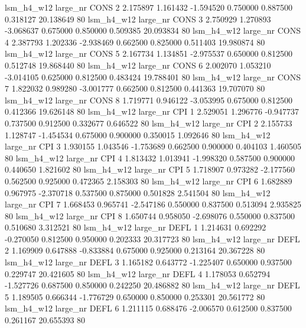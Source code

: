   lsm_h4_w12   large_nr     CONS                 2  2.175897  1.161432  -1.594520 0.750000 0.887500  0.318127   20.138649 80
  lsm_h4_w12   large_nr     CONS                 3  2.750929  1.270893  -3.068637 0.675000 0.850000  0.509385   20.093834 80
  lsm_h4_w12   large_nr     CONS                 4  2.387793  1.202336  -2.938469 0.662500 0.825000  0.511403   19.980874 80
  lsm_h4_w12   large_nr     CONS                 5  2.167734  1.134851  -2.975537 0.650000 0.812500  0.512748   19.868440 80
  lsm_h4_w12   large_nr     CONS                 6  2.002070  1.053210  -3.014105 0.625000 0.812500  0.483424   19.788401 80
  lsm_h4_w12   large_nr     CONS                 7  1.822032  0.989280  -3.001777 0.662500 0.812500  0.441363   19.707070 80
  lsm_h4_w12   large_nr     CONS                 8  1.719771  0.946122  -3.053995 0.675000 0.812500  0.412366   19.626148 80
  lsm_h4_w12   large_nr      CPI                 1  2.529051  1.296776  -0.947737 0.737500 0.912500  0.332677    0.646522 80
  lsm_h4_w12   large_nr      CPI                 2  2.155733  1.128747  -1.454534 0.675000 0.900000  0.350015    1.092646 80
  lsm_h4_w12   large_nr      CPI                 3  1.930155  1.043546  -1.753689 0.662500 0.900000  0.404103    1.460505 80
  lsm_h4_w12   large_nr      CPI                 4  1.813432  1.013941  -1.998320 0.587500 0.900000  0.440650    1.821602 80
  lsm_h4_w12   large_nr      CPI                 5  1.718907  0.973282  -2.177560 0.562500 0.925000  0.472365    2.158303 80
  lsm_h4_w12   large_nr      CPI                 6  1.682889  0.967975  -2.370718 0.537500 0.875000  0.501828    2.541504 80
  lsm_h4_w12   large_nr      CPI                 7  1.668453  0.965741  -2.547186 0.550000 0.837500  0.513094    2.935825 80
  lsm_h4_w12   large_nr      CPI                 8  1.650744  0.958050  -2.698076 0.550000 0.837500  0.510680    3.312521 80
  lsm_h4_w12   large_nr     DEFL                 1  1.214631  0.692292  -0.270050 0.812500 0.950000  0.202333   20.317723 80
  lsm_h4_w12   large_nr     DEFL                 2  1.169909  0.647888  -0.833884 0.675000 0.925000  0.213164   20.367228 80
  lsm_h4_w12   large_nr     DEFL                 3  1.165182  0.643772  -1.225407 0.650000 0.937500  0.229747   20.421605 80
  lsm_h4_w12   large_nr     DEFL                 4  1.178053  0.652794  -1.527726 0.687500 0.850000  0.242250   20.486882 80
  lsm_h4_w12   large_nr     DEFL                 5  1.189505  0.666344  -1.776729 0.650000 0.850000  0.253301   20.561772 80
  lsm_h4_w12   large_nr     DEFL                 6  1.211115  0.688476  -2.006570 0.612500 0.837500  0.261167   20.655393 80

